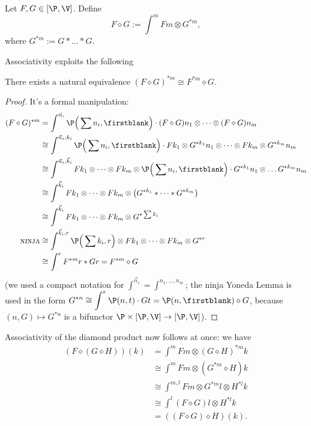 \begin{definition}
Let $F,G\in [\P,\V]$. Define
\[
F\diamond G:=\int^m Fm\otimes G^{\ast m},
\]
where $G^{\ast m} := G\ast\dots \ast G$.
\end{definition}
Associativity exploits the following
\begin{lemma}
 There exists a natural equivalence $(F\diamond G)^{\ast m}\cong F^{\ast m}\diamond G$.
\end{lemma} 
\begin{proof}
It's a formal manipulation:
\begin{align*}
 (F\diamond G)^{\ast m}&=\int^{\vec n_i} \P\Big(\sum n_i,\firstblank\Big)\cdot (F\diamond G)n_1\otimes\dots\otimes (F\diamond G)n_m \\
&\cong \int^{\vec n_i,k_i}\P\Big(\sum n_i,\firstblank\Big)\cdot Fk_1\otimes G^{\ast k_1}n_1\otimes\dots\otimes Fk_m\otimes G^{\ast k_m}n_m\\
&\cong \int^{\vec n_i,\vec k_i}Fk_1\otimes\dots\otimes Fk_m\otimes \P\Big(\sum n_i,\firstblank\Big)\cdot G^{\ast k_1}n_1\otimes\dots G^{\ast k_m}n_m\\
&\cong \int^{\vec k_i} Fk_1\otimes\dots\otimes Fk_m\otimes \big(G^{\ast k_1}\ast \dots\ast G^{\ast k_m}\big)\\
&\cong \int^{\vec k_i} Fk_1\otimes\dots\otimes Fk_m\otimes G^{\ast \sum k_i}\\
\textsc{ninja} &\cong \int^{\vec k_i,r}\P\Big(\sum k_i,r\Big)\otimes Fk_1\otimes\dots\otimes Fk_m\otimes G^{\ast r}\\
&\cong \int^r F^{\ast m}r\ast Gr = F^{\ast m}\diamond G
\end{align*}
(we used a compact notation for $\int^{\vec n_i}=\int^{n_1,\dots,n_m}$; the ninja Yoneda Lemma is used in the form $\displaystyle G^{\ast n}\cong \int^r\P(n,t)\cdot Gt = \P(n,\firstblank)\diamond G$, because $(n,G)\mapsto G^{\ast n}$ is a bifunctor $\P \times [\P, \V]\to [\P, \V]$).
\end{proof}
Associativity of the diamond product now follows at once: we have
\begin{align*}
 (F\diamond(G\diamond H))(k) & =\int^m Fm\otimes (G\diamond H)^{\ast m}k\\
&\cong \int^m Fm\otimes (G^{\ast m}\diamond H)k\\
&\cong \int^{m,l}Fm\otimes G^{\ast m}l\otimes H^{\ast l}k\\
&\cong \int^l (F\diamond G)l\otimes H^{\ast l}k\\
& = ((F\diamond G)\diamond H)(k).
\end{align*}
